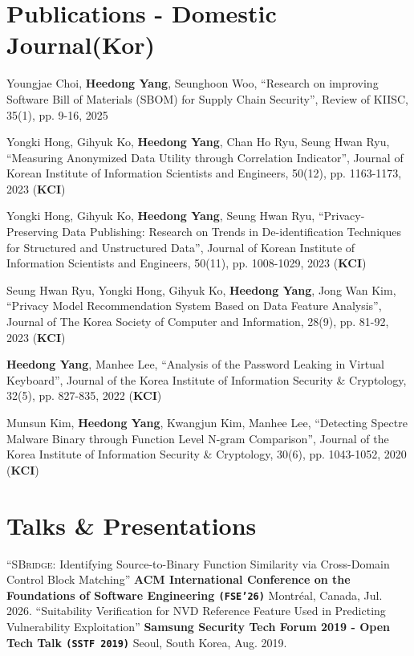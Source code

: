 \documentclass[letterpaper,11pt]{article}
\begin{document}
\section{Publications - Domestic Journal(Kor)}
  \vspace{3pt}
  \paperKJourListStart
    \resumeItem
    {Youngjae Choi, \textbf{Heedong Yang}, Seunghoon Woo, ``Research on improving Software Bill of Materials (SBOM) for Supply Chain Security'', Review of KIISC, 35(1), pp. 9-16, 2025}

    \resumeItem
    {Yongki Hong, Gihyuk Ko, \textbf{Heedong Yang}, Chan Ho Ryu, Seung Hwan Ryu, ``Measuring Anonymized Data Utility through Correlation Indicator'', Journal of Korean Institute of Information Scientists and Engineers, 50(12), pp. 1163-1173, 2023 (\textbf{KCI})}

    \resumeItem
    {Yongki Hong, Gihyuk Ko, \textbf{Heedong Yang}, Seung Hwan Ryu, ``Privacy-Preserving Data Publishing: Research on Trends in De-identification Techniques for Structured and Unstructured Data'', Journal of Korean Institute of Information Scientists and Engineers, 50(11), pp. 1008-1029, 2023 (\textbf{KCI})}

    \resumeItem
      {Seung Hwan Ryu, Yongki Hong, Gihyuk Ko, \textbf{Heedong Yang}, Jong Wan Kim, ``Privacy Model Recommendation System Based on Data Feature Analysis'', Journal of The Korea Society of Computer and Information, 28(9), pp. 81-92, 2023 (\textbf{KCI})}

    \resumeItem
      {\textbf{Heedong Yang}, Manhee Lee, ``Analysis of the Password Leaking in Virtual Keyboard'', Journal of the Korea Institute of Information Security \& Cryptology, 32(5), pp. 827-835, 2022 (\textbf{KCI})}

    \resumeItem
      {Munsun Kim, \textbf{Heedong Yang}, Kwangjun Kim, Manhee Lee, ``Detecting Spectre Malware Binary through Function Level N-gram Comparison'', Journal of the Korea Institute of Information Security \& Cryptology, 30(6), pp. 1043-1052, 2020 (\textbf{KCI})}

  \paperKJourListEnd



\section{Talks \& Presentations}
\vspace{3pt}
\talkListStart
  \talkItem
    {``{\textsc{SBridge}}: Identifying Source-to-Binary Function Similarity via Cross-Domain Control Block Matching''}
    {\textbf{ACM International Conference on the Foundations of Software Engineering \texttt{(FSE'26)}}}
    {Montréal, Canada, Jul. 2026.}
  \talkItem
    {``Suitability Verification for NVD Reference Feature Used in Predicting Vulnerability Exploitation''}
    {\textbf{Samsung Security Tech Forum 2019 - Open Tech Talk \texttt{(SSTF 2019)}} }
    {Seoul, South Korea, Aug. 2019.}
 \talkListEnd
\end{document}

